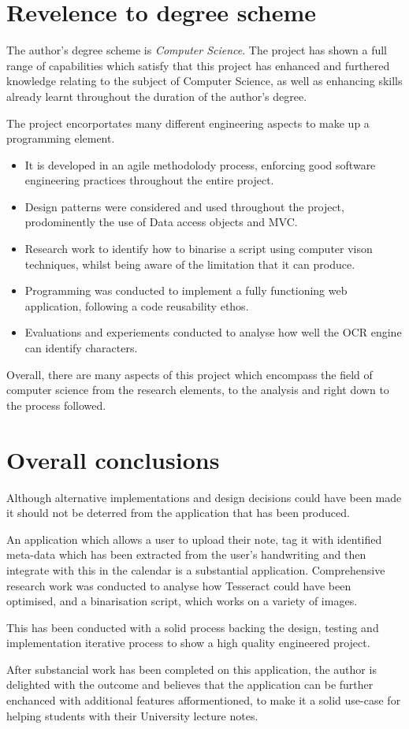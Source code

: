 \section{Revelence to degree scheme}
The author's degree scheme is \textit{Computer Science}. The project has shown a full range of capabilities which satisfy that this project has enhanced and furthered knowledge relating to the subject of Computer Science, as well as enhancing skills already learnt throughout the duration of the author's degree.

The project encorportates many different engineering aspects to make up a programming element.
\begin{itemize}
	\item It is developed in an agile methodolody process, enforcing good software engineering practices throughout the entire project.
	\item Design patterns were considered and used throughout the project, prodominently the use of Data access objects and MVC.
	\item Research work to identify how to binarise a script using computer vison techniques, whilst being aware of the limitation that it can produce.
	\item Programming was conducted to implement a fully functioning web application, following a code reusability ethos.
	\item Evaluations and experiements conducted to analyse how well the OCR engine can identify characters.
\end{itemize}

Overall, there are many aspects of this project which encompass the field of computer science from the research elements, to the analysis  and right down to the process followed.

\section{Overall conclusions}
Although alternative implementations and design decisions could have been made it should not be deterred from the application that has been produced.

An application which allows a user to upload their note, tag it with identified meta-data which has been extracted from the user's handwriting and then integrate with this in the calendar is a substantial application. Comprehensive research work was conducted to analyse how Tesseract could have been optimised, and a binarisation script, which works on a variety of images.

This has been conducted with a solid process backing the design, testing and implementation iterative process to show a high quality engineered project.

After substancial work has been completed on this application, the author is delighted with the outcome and believes that the application can be further enchanced with additional features afformentioned, to make it a solid use-case for helping students with their University lecture notes.
